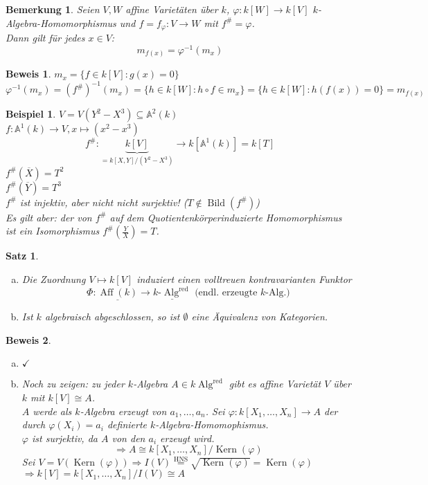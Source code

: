 \documentclass[a4paper,12pt]{report}
\theoremstyle{break}
\newtheorem{Satz}{Satz}
\newtheorem{Bem}[Def]{Bemerkung}
\newtheorem{Bsp}[Def]{Beispiel}
\theoremstyle{nonumberbreak}
\newtheorem{Bew}{Beweis}
\theoremstyle{nonumberplain}
\DeclareMathOperator{\Aff}{Aff}
\DeclareMathOperator{\Alg}{Alg}
\DeclareMathOperator{\Kern}{Kern}
\DeclareMathOperator{\Bild}{Bild}
\DeclareMathOperator{\red}{red}%
\newcommand{\A}{\mathbb{A}}
\begin{document}
\begin{Bem}
Seien $V,W$ affine Variet\"aten \"uber $k$, $\varphi:k[W]\to k[V]$ $k$-Algebra-Homomorphismus und $f= f_{\varphi}: V\to W$ mit $f^{\#}=\varphi$.\\
Dann gilt f\"ur jedes $x\in V$:
	\[ m_{f(x)}=\varphi^{-1}(m_x)\]
\end{Bem}

\begin{Bew}
$m_x=\{f\in k[V]: g(x)=0\}$\\
\[\varphi^{-1}(m_x)=(f^{\#})^{-1}(m_x)=\{h\in k[W]:h\circ f \in m_x\} = \{h\in k[W]:h(f(x))=0\} =m_{f(x)}\]
\end{Bew}

\begin{Bsp}
$V = V(Y^2-X^3)\subseteq\A^2(k)$\\
$f: \A^1(k)\to V, x\mapsto(x^2-x^3)$\\
\[f^{\#}:\underbrace{k[V]}_{=k[X,Y]/(Y^2-X^3)}\to k[\A^1(k)]=k[T]\]
$f^{\#}(\overline X)=T^2$\\
$f^{\#}(\overline Y)=T^3$\\

$f^{\#}$ ist injektiv, aber nicht nicht surjektiv! ($T\notin \Bild(f^{\#})$)\\
Es gilt aber: der von $f^{\#}$ auf dem Quotientenk\"orperinduzierte Homomorphismus ist ein Isomorphismus $f^{\#}(\frac{Y}{X}) = T$.
\end{Bsp}

\begin{Satz}\label{satz4}\begin{enumerate}[a)]
\item
	Die Zuordnung $V\mapsto k[V]$ induziert einen volltreuen kontravarianten Funktor
		\[\Phi: \underline{\Aff(k)}\to \underline{k\textrm{-}\Alg^{\red}} \textrm{ (endl. erzeugte }k\textrm{-Alg.)}\]
\item
	Ist $k$ algebraisch abgeschlossen, so ist $\emptyset$ eine \"Aquivalenz von Kategorien.
\end{enumerate}\end{Satz}

\begin{Bew}\begin{enumerate}[a)]\item $\checkmark$\item
Noch zu zeigen: zu jeder $k$-Algebra $A\in k\Alg^{\red}$ gibt es affine Variet\"at $V$ \"uber $k$ mit $k[V]\cong A$.\\
$A$ werde als $k$-Algebra erzeugt von $a_1,\dots ,a_n$. Sei $\varphi: k[X_1,\dots ,X_n]\to A$ der durch $\varphi(X_i)=a_i$ definierte $k$-Algebra-Homomophismus.\\
$\varphi$ ist surjektiv, da $A$ von den $a_i$ erzeugt wird.
	\[\Rightarrow A \cong k[X_1,\dots ,X_n]/\Kern(\varphi)\]
Sei $V=V(\Kern(\varphi))\Rightarrow I(V) \stackrel{\textrm{HNS}}{=} \sqrt{\Kern(\varphi)} = \Kern(\varphi)$\\
$\Rightarrow k[V]=k[X_1,\dots ,X_n]/I(V)\cong A$
\end{enumerate}\end{Bew}
\end{document}
